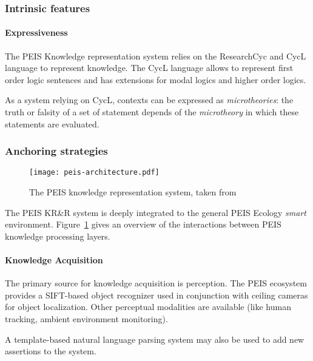 \documentclass[a4paper]{article}
\begin{document}
\subsubsection{Intrinsic features}
\label{sect|peis-intrinsic-features}

\paragraph{Expressiveness} The PEIS Knowledge representation system relies on
the {\sc ResearchCyc} and {\sc CycL} language to represent knowledge. The {\sc CycL} language
allows to represent first order logic sentences and has extensions for modal logics and higher order logics.


As a system relying on {\sc CycL}, contexts can be expressed as
\emph{microtheories}: the truth or falsity of a set of statement depends of the
\emph{microtheory} in which these statements are evaluated.


\subsubsection{Anchoring strategies}
\label{sect|peis-anchoring}

\begin{figure}
	\centering
	\texttt{[image: peis-architecture.pdf]}
	\caption{The PEIS knowledge representation system, taken from~\cite{Daoutis2009}}
	\label{fig|peis-archi}
\end{figure}

The PEIS KR\&R system is deeply integrated to the general PEIS Ecology
\emph{smart} environment. Figure~\ref{fig|peis-archi} gives an overview of the
interactions between PEIS knowledge processing layers.

\paragraph{Knowledge Acquisition} The primary source for knowledge acquisition
is perception.  The PEIS ecosystem provides a SIFT-based object recognizer used
in conjunction with ceiling cameras for object localization.  Other perceptual
modalities are available (like human tracking, ambient environment monitoring).

A template-based natural language parsing system may also be used to add new
assertions to the system.
\end{document}
